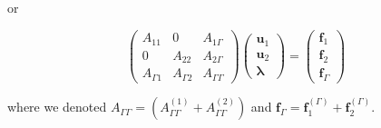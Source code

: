 \documentclass[11pt]{book}
\begin{document}
or

$$
\left(\begin{array}{ccc}
A_{11} & 0 & A_{1 \Gamma} \\
0 & A_{22} & A_{2 \Gamma} \\
A_{\Gamma 1} & A_{\Gamma 2} & A_{\Gamma \Gamma}
\end{array}\right)\left(\begin{array}{c}
\mathbf{u}_{1} \\
\mathbf{u}_{2} \\
\boldsymbol{\lambda}
\end{array}\right)=\left(\begin{array}{l}
\mathbf{f}_{1} \\
\mathbf{f}_{2} \\
\mathbf{f}_{\Gamma}
\end{array}\right)
$$

where we denoted $A_{\Gamma \Gamma}=\left(A_{\Gamma \Gamma}^{(1)}+A_{\Gamma \Gamma}^{(2)}\right)$ and $\mathbf{f}_{\Gamma}=\mathbf{f}_{1}^{(\Gamma)}+\mathbf{f}_{2}^{(\Gamma)}$.
\end{document}
